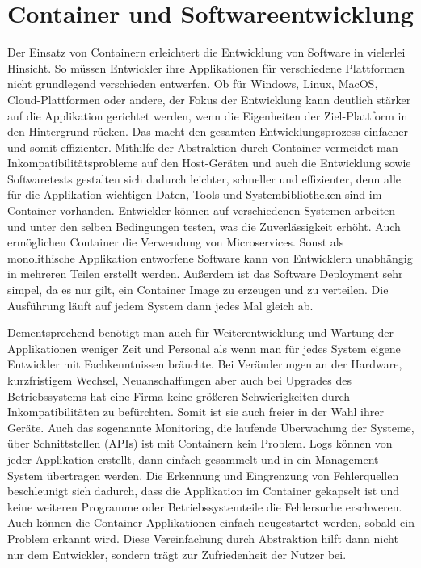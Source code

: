 \section{Container und Softwareentwicklung} 
\label{sec:Softwareentwicklung}
Der Einsatz von Containern erleichtert die Entwicklung von Software in vielerlei Hinsicht. So müssen Entwickler ihre Applikationen für verschiedene Plattformen nicht grundlegend verschieden entwerfen. Ob für Windows, Linux, MacOS, Cloud-Plattformen oder andere, der Fokus der Entwicklung kann deutlich stärker auf die Applikation gerichtet werden, wenn die Eigenheiten der Ziel-Plattform in den Hintergrund rücken. Das macht den gesamten Entwicklungsprozess einfacher und somit effizienter.
Mithilfe der Abstraktion durch Container vermeidet man Inkompatibilitätsprobleme auf den Host-Geräten und auch die Entwicklung sowie Softwaretests gestalten sich dadurch leichter, schneller und effizienter, denn alle für die Applikation wichtigen Daten, Tools und Systembibliotheken sind im Container vorhanden. Entwickler können auf verschiedenen Systemen arbeiten und unter den selben Bedingungen testen, was die Zuverlässigkeit erhöht. 
Auch ermöglichen Container die Verwendung von Microservices. Sonst als monolithische Applikation entworfene Software kann von Entwicklern unabhängig in mehreren Teilen erstellt werden.
Außerdem ist das Software Deployment sehr simpel, da es nur gilt, ein Container Image zu erzeugen und zu verteilen. Die Ausführung läuft auf jedem System dann jedes Mal gleich ab.

Dementsprechend benötigt man auch für Weiterentwicklung und Wartung der Applikationen weniger Zeit und Personal als wenn man für jedes System eigene Entwickler mit Fachkenntnissen bräuchte.
Bei Veränderungen an der Hardware, kurzfristigem Wechsel, Neuanschaffungen aber auch bei Upgrades des Betriebssystems hat eine Firma keine größeren Schwierigkeiten durch Inkompatibilitäten zu befürchten. Somit ist sie auch freier in der Wahl ihrer Geräte.
Auch das sogenannte Monitoring, die laufende Überwachung der Systeme, über Schnittstellen (APIs) ist mit Containern kein Problem. Logs können von jeder Applikation erstellt, dann einfach gesammelt und in ein Management-System übertragen werden. Die Erkennung und Eingrenzung von Fehlerquellen beschleunigt sich dadurch, dass die Applikation im Container gekapselt ist und keine weiteren Programme oder Betriebssystemteile die Fehlersuche erschweren. Auch können die Container-Applikationen einfach neugestartet werden, sobald ein Problem erkannt wird.
Diese Vereinfachung durch Abstraktion hilft dann nicht nur dem Entwickler, sondern trägt zur Zufriedenheit der Nutzer bei. 

